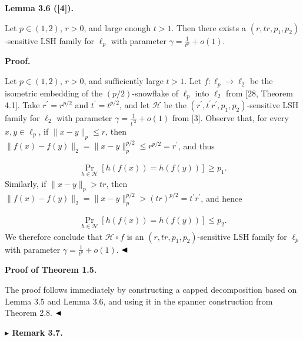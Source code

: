 \documentclass[10pt,a4paper]{amsart}
\begin{document}
\par
\par
\par\medskip\noindent\textbf{Lemma 3.6 ([4]).}\par
Let $p\in(1,2)$, $r>0$, and large enough $t>1$. Then there exists a $(r,tr,p_{1},p_{2})$-sensitive LSH family for $\ell_{p}$ with parameter $\gamma=\frac{1}{t^{p}}+o(1)$.
\par
\par
\par
\par\medskip\noindent\textbf{Proof.}\par
Let $p\in(1,2)$, $r>0$, and sufficiently large $t>1$. Let $f:\ell_{p}\to\ell_{2}$ be the isometric embedding of the $(p/2)$-snowflake of $\ell_{p}$ into $\ell_{2}$ from [28, Theorem 4.1]. Take $r^{\prime}=r^{p/2}$ and $t^{\prime}=t^{p/2}$, and let $\mathcal{H}$ be the $(r^{\prime},t^{\prime}r^{\prime},p_{1},p_{2})$-sensitive LSH family for $\ell_{2}$ with parameter $\gamma=\frac{1}{t^{\prime 2}}+o(1)$ from [3]. Observe that, for every $x,y\in\ell_{p}$, if $\|x-y\|_{p}\leq r$, then $\|f(x)-f(y)\|_{2}=\|x-y\|_{p}^{p/2}\leq r^{p/2}=r^{\prime}$, and thus
\par
\[\begin{aligned}
\Pr_{h\in\mathcal{H}}[h(f(x))=h(f(y))]\geq p_{1}.
\end{aligned}\]
Similarly, if $\|x-y\|_{p}>tr$, then $\|f(x)-f(y)\|_{2}=\|x-y\|_{p}^{p/2}>(tr)^{p/2}=t^{\prime}r^{\prime}$, and hence
\par
\[\begin{aligned}
\Pr_{h\in\mathcal{H}}[h(f(x))=h(f(y))]\leq p_{2}.
\end{aligned}\]
We therefore conclude that $\mathcal{H}\circ f$ is an $(r,tr,p_{1},p_{2})$-sensitive LSH family for $\ell_{p}$ with parameter $\gamma=\frac{1}{t^{p}}+o(1)$. $\hfill\blacktriangleleft$
\par
\par
\par
\par\medskip\noindent\textbf{Proof of Theorem 1.5.}\par
The proof follows immediately by constructing a capped decomposition based on Lemma 3.5 and Lemma 3.6, and using it in the spanner construction from Theorem 2.8. $\hfill\blacktriangleleft$
\par
\par
\par\medskip\noindent\textbf{$\blacktriangleright$ Remark 3.7.}\par
\end{document}
